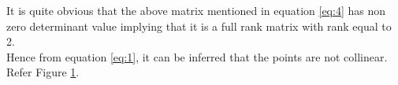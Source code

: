 \documentclass[12pt]{article}
\begin{document}
\begin{enumerate}
\begin{figure}[!h]
\begin{center}
	\end{center}
\caption{}
\label{fig:Fig1}
\end{figure}
It is quite obvious that the above matrix mentioned in equation \ref{eq:4} has non zero determinant value implying that it is a full rank matrix with rank equal to 2. \\
Hence from equation \ref{eq:1}, it can be inferred that the points are not collinear. \\
Refer Figure \ref{fig:Fig1}.

\end{enumerate}
\end{document}
